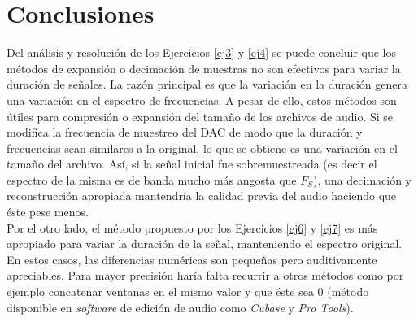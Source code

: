 
\section{Conclusiones} 

	Del análisis y resolución de los Ejercicios \ref{ej3} y \ref{ej4} se puede concluir que los métodos de expansión o decimación de muestras no son efectivos para variar la duración de señales. La razón principal es que la variación en la duración genera una variación en el espectro de frecuencias. A pesar de ello, estos métodos son útiles para compresión o expansión del tamaño de los archivos de audio. Si se modifica la frecuencia de muestreo del DAC de modo que la duración y frecuencias sean similares a la original, lo que se obtiene es una variación en el tamaño del archivo. Así, si la señal inicial fue sobremuestreada (es decir el espectro de la misma es de banda mucho más angosta que $F_S$), una decimación y reconstrucción apropiada mantendría la calidad previa del audio haciendo que éste pese menos.\\

	Por el otro lado, el método propuesto por los Ejercicios \ref{ej6} y \ref{ej7} es más apropiado para variar la duración de la señal, manteniendo el espectro original. En estos casos, las diferencias numéricas son pequeñas pero auditivamente apreciables. Para mayor precisión haría falta recurrir a otros métodos como por ejemplo concatenar ventanas en el mismo valor y que éste sea 0 (método disponible en \emph{software} de edición de audio como \emph{Cubase} y \emph{Pro Tools}).
